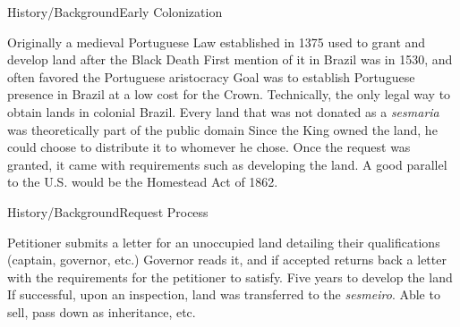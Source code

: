 \documentclass[aspectratio=1610]{beamer}
\begin{document}
\begin{frame}{History/Background}{Early Colonization}
    \begin{outline}
        \1 Originally a medieval Portuguese Law established in 1375 used to grant and develop land after the Black Death \parencite[p.~16]{Diegues_Junior1959-ba}
        \vspace{1mm}
        \pause 
        \1 First mention of it in Brazil was in 1530, and often favored the Portuguese aristocracy \parencites[p.~16]{Diegues_Junior1959-ba}{Lobb1976-mc}
        \vspace{1mm}
        \pause 
        \1 Goal was to establish Portuguese presence in Brazil at a low cost for the Crown.
        \pause 
        \vspace{-2mm}
        \1 Technically, the only legal way to obtain lands in colonial Brazil.
            \2 Every land that was not donated as a \textit{sesmaria} was theoretically part of the public domain
            \2 Since the King owned the land, he could choose to distribute it to whomever he chose.
        \vspace{1mm}
        \pause 
        \1 Once the request was granted, it came with requirements such as developing the land.
        \vspace{1mm}
            \2 A good parallel to the U.S. would be the Homestead Act of 1862. 
    \end{outline}
\end{frame}

\begin{frame}{History/Background}{Request Process}
    \begin{outline}
        \1 Petitioner submits a letter for an unoccupied land detailing their qualifications (captain, governor, etc.)
        \vspace{1mm}
        \pause 
        \1 Governor reads it, and if accepted returns back a letter with the requirements for the petitioner to satisfy.
        \vspace{1mm}
        \pause 
        \1 Five years to develop the land
        \vspace{1mm}
        \pause 
        \1 If successful, upon an inspection, land was transferred to the \textit{sesmeiro}.
        \vspace{1mm}
        \pause 
        \1 Able to sell, pass down as inheritance, etc. 
    \end{outline}
\end{frame}
\end{document}
